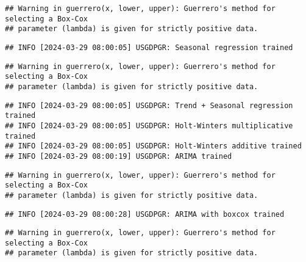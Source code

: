 \documentclass[
]{article}
\begin{document}
\begin{verbatim}
## Warning in guerrero(x, lower, upper): Guerrero's method for selecting a Box-Cox
## parameter (lambda) is given for strictly positive data.
\end{verbatim}

\begin{verbatim}
## INFO [2024-03-29 08:00:05] USGDPGR: Seasonal regression trained
\end{verbatim}

\begin{verbatim}
## Warning in guerrero(x, lower, upper): Guerrero's method for selecting a Box-Cox
## parameter (lambda) is given for strictly positive data.
\end{verbatim}

\begin{verbatim}
## INFO [2024-03-29 08:00:05] USGDPGR: Trend + Seasonal regression trained
## INFO [2024-03-29 08:00:05] USGDPGR: Holt-Winters multiplicative trained
## INFO [2024-03-29 08:00:05] USGDPGR: Holt-Winters additive trained
## INFO [2024-03-29 08:00:19] USGDPGR: ARIMA trained
\end{verbatim}

\begin{verbatim}
## Warning in guerrero(x, lower, upper): Guerrero's method for selecting a Box-Cox
## parameter (lambda) is given for strictly positive data.
\end{verbatim}

\begin{verbatim}
## INFO [2024-03-29 08:00:28] USGDPGR: ARIMA with boxcox trained
\end{verbatim}

\begin{verbatim}
## Warning in guerrero(x, lower, upper): Guerrero's method for selecting a Box-Cox
## parameter (lambda) is given for strictly positive data.
\end{verbatim}
\end{document}
